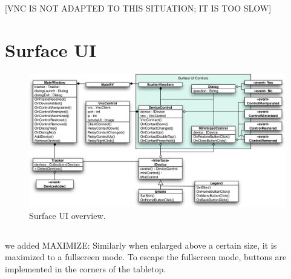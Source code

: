 [VNC IS NOT ADAPTED TO THIS SITUATION; IT IS TOO SLOW]

\section{Surface UI}
\label{sec:surfaceui}

\begin{figure}[htb]
  \centering
    \includegraphics[width=1\textwidth]{images/surfaceDiagram}
    \caption{Surface UI overview.}
    \label{fig:surfaceDiagram}
\end{figure}


\subsection{}

we added MAXIMIZE:
Similarly when enlarged above a certain size, it is maximized to a fullscreen mode. To escape the fullscreen mode, buttons are implemented in the corners of the tabletop.




